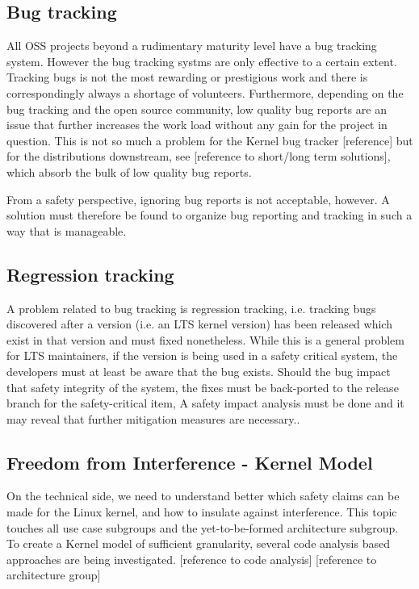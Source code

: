 \documentclass[12pt]{../Common_files/ElisaPaper}
\begin{document}
\subsection{Bug tracking}
All OSS projects 
beyond a rudimentary maturity level 
have a bug tracking system.
However the bug tracking systms are only effective to a certain extent.
Tracking bugs is not the most rewarding or prestigious work 
and 
there is correspondingly always a shortage of volunteers.
Furthermore, depending on the bug tracking and the open source community, 
low quality bug reports are an issue that further increases the work load without any gain for the project in question.
This is not so much a problem for the Kernel bug tracker [reference] 
but for the distributions downstream, see [reference to short/long term solutions], 
which absorb the bulk of low quality bug reports.

From a safety perspective, 
ignoring bug reports is not acceptable, however. 
A solution must therefore be found to organize bug reporting and tracking in such a way that is manageable.

\subsection{Regression tracking}
A problem related to bug tracking is regression tracking, 
i.e. tracking bugs discovered after 
a version (i.e. an LTS kernel version) has been released
which exist in that version
and 
must fixed nonetheless.
While this is a general problem for LTS maintainers,
if the version is being used in a safety critical system, 
the developers must at least be aware that the bug exists.
Should the bug impact that safety integrity of the system, 
the fixes must be back-ported to the release branch for the safety-critical item, 
A safety impact analysis must be done and it may reveal that further mitigation measures are necessary..



\subsection{Freedom from Interference - Kernel Model}
On the technical side, we need to understand better which safety claims can be made for the Linux kernel, 
and how to insulate against interference. 
This topic touches all use case subgroups and the yet-to-be-formed architecture subgroup.
To create a Kernel model of sufficient granularity, 
several code analysis based approaches are being investigated.
[reference to code analysis]
[reference to architecture group]
\end{document}

